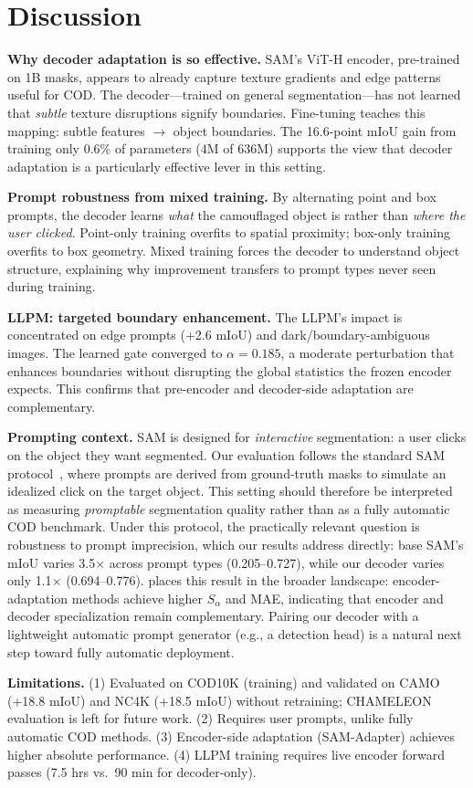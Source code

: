 \section{Discussion}

\noindent\textbf{Why decoder adaptation is so effective.}
SAM's ViT-H encoder, pre-trained on 1B masks, appears to already capture texture gradients and edge patterns useful for COD. The decoder---trained on general segmentation---has not learned that \emph{subtle} texture disruptions signify boundaries. Fine-tuning teaches this mapping: subtle features $\rightarrow$ object boundaries. The 16.6-point mIoU gain from training only 0.6\% of parameters (4M of 636M) supports the view that decoder adaptation is a particularly effective lever in this setting.

\noindent\textbf{Prompt robustness from mixed training.}
By alternating point and box prompts, the decoder learns \emph{what} the camouflaged object is rather than \emph{where the user clicked}. Point-only training overfits to spatial proximity; box-only training overfits to box geometry. Mixed training forces the decoder to understand object structure, explaining why improvement transfers to prompt types never seen during training.

\noindent\textbf{LLPM: targeted boundary enhancement.}
The LLPM's impact is concentrated on edge prompts (+2.6 mIoU) and dark/boundary-ambiguous images. The learned gate converged to $\alpha = 0.185$, a moderate perturbation that enhances boundaries without disrupting the global statistics the frozen encoder expects. This confirms that pre-encoder and decoder-side adaptation are complementary.

\noindent\textbf{Prompting context.}
SAM is designed for \emph{interactive} segmentation: a user clicks on the object they want segmented. Our evaluation follows the standard SAM protocol~\cite{kirillov2023sam}, where prompts are derived from ground-truth masks to simulate an idealized click on the target object. This setting should therefore be interpreted as measuring \emph{promptable} segmentation quality rather than as a fully automatic COD benchmark. Under this protocol, the practically relevant question is robustness to prompt imprecision, which our results address directly: base SAM's mIoU varies 3.5$\times$ across prompt types (0.205--0.727), while our decoder varies only 1.1$\times$ (0.694--0.776).  places this result in the broader landscape: encoder-adaptation methods achieve higher $S_\alpha$ and MAE, indicating that encoder and decoder specialization remain complementary. Pairing our decoder with a lightweight automatic prompt generator (e.g., a detection head) is a natural next step toward fully automatic deployment.

\noindent\textbf{Limitations.}
(1) Evaluated on COD10K (training) and validated on CAMO (+18.8 mIoU) and NC4K (+18.5 mIoU) without retraining; CHAMELEON evaluation is left for future work. (2) Requires user prompts, unlike fully automatic COD methods. (3) Encoder-side adaptation (SAM-Adapter) achieves higher absolute performance. (4) LLPM training requires live encoder forward passes (7.5 hrs vs.\ 90 min for decoder-only).
